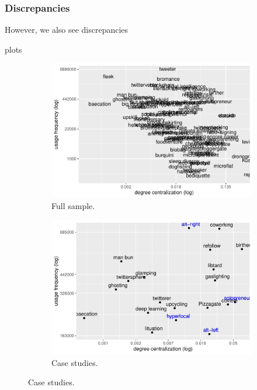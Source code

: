 \documentclass[
  a4paper,
  abstract=on,
  captions=tableabove
  ]{scrartcl}
\begin{document}
    \subsubsection{Discrepancies}
      \label{subsubsec:discrepancies}

  However, we also see discrepancies

  plots

  \begin{figure}[H]
    \centering
    \begin{subfigure}{.45\linewidth}
      \caption{Full sample.}
      \centering
      \includegraphics[width=\linewidth, height=.8\textheight, keepaspectratio]{img/full_cent_freq_overall.pdf}
    \end{subfigure}
    \begin{subfigure}{.45\linewidth}
      \caption{Case studies.}
      \centering
      \includegraphics[width=\linewidth, height=.8\textheight, keepaspectratio]{img/cases_cent_freq_overall.pdf}
    \end{subfigure}
  \end{figure}
\end{document}
